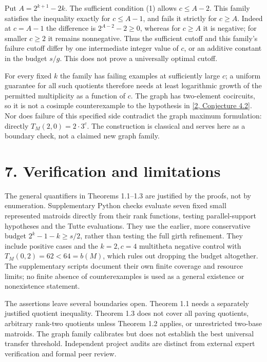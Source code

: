 \documentclass[11pt]{article}
\begin{document}
Put \(A=2^{k+1}-2k\). The sufficient condition (1) allows \(c\le A-2\). This family satisfies the inequality exactly for \(c\le A-1\), and fails it strictly for \(c\ge A\). Indeed at \(c=A-1\) the difference is \(2^{A-2}-2\ge0\), whereas for \(c\ge A\) it is negative; for smaller \(c\ge2\) it remains nonnegative. Thus the sufficient cutoff and this family's failure cutoff differ by one intermediate integer value of \(c\), or an additive constant in the budget \(s/g\). This does not prove a universally optimal cutoff.

For every fixed \(k\) the family has failing examples at sufficiently large \(c\); a uniform guarantee for all such quotients therefore needs at least logarithmic growth of the permitted multiplicity as a function of \(c\). The graph has two-element cocircuits, so it is not a cosimple counterexample to the hypothesis in \hyperlink{ref2}{[2, Conjecture 4.2]}. Nor does failure of this specified side contradict the graph maximum formulation: directly \(T_M(2,0)=2\cdot3^c\). The construction is classical and serves here as a boundary check, not a claimed new graph family.

\section*{7. Verification and limitations}

The general quantifiers in Theorems 1.1--1.3 are justified by the proofs, not by enumeration. Supplementary Python checks evaluate seven fixed small represented matroids directly from their rank functions, testing parallel-support hypotheses and the Tutte evaluations. They use the earlier, more conservative budget \(2^k-1-k\ge s/2\), rather than testing the full girth refinement. They include positive cases and the \(k=2,c=4\) multitheta negative control with \(T_M(0,2)=62<64=b(M)\), which rules out dropping the budget altogether. The supplementary scripts document their own finite coverage and resource limits; no finite absence of counterexamples is used as a general existence or nonexistence statement.

The assertions leave several boundaries open. Theorem 1.1 needs a separately justified quotient inequality. Theorem 1.3 does not cover all paving quotients, arbitrary rank-two quotients unless Theorem 1.2 applies, or unrestricted two-base matroids. The graph family calibrates but does not establish the best universal transfer threshold. Independent project audits are distinct from external expert verification and formal peer review.
\end{document}
